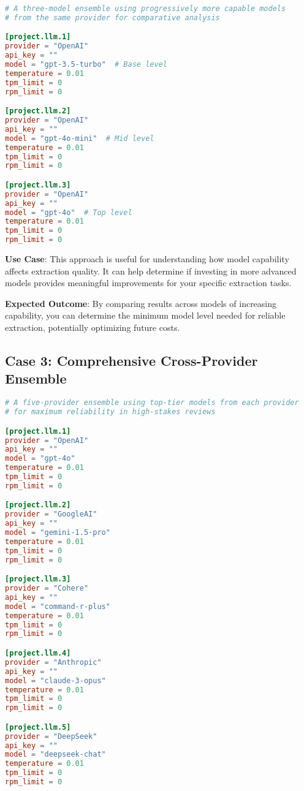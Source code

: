 \begin{configbox}
\begin{lstlisting}[language=TOML]
# A three-model ensemble using progressively more capable models
# from the same provider for comparative analysis

[project.llm.1]
provider = "OpenAI"
api_key = ""
model = "gpt-3.5-turbo"  # Base level
temperature = 0.01
tpm_limit = 0
rpm_limit = 0

[project.llm.2]
provider = "OpenAI"
api_key = ""
model = "gpt-4o-mini"  # Mid level
temperature = 0.01
tpm_limit = 0
rpm_limit = 0

[project.llm.3]
provider = "OpenAI"
api_key = ""
model = "gpt-4o"  # Top level
temperature = 0.01
tpm_limit = 0
rpm_limit = 0
\end{lstlisting}
\end{configbox}

\textbf{Use Case}: This approach is useful for understanding how model capability affects extraction quality. It can help determine if investing in more advanced models provides meaningful improvements for your specific extraction tasks.

\textbf{Expected Outcome}: By comparing results across models of increasing capability, you can determine the minimum model level needed for reliable extraction, potentially optimizing future costs.

\subsection{Case 3: Comprehensive Cross-Provider Ensemble}

\begin{configbox}
\begin{lstlisting}[language=TOML]
# A five-provider ensemble using top-tier models from each provider
# for maximum reliability in high-stakes reviews

[project.llm.1]
provider = "OpenAI"
api_key = ""
model = "gpt-4o"
temperature = 0.01
tpm_limit = 0
rpm_limit = 0

[project.llm.2]
provider = "GoogleAI"
api_key = ""
model = "gemini-1.5-pro"
temperature = 0.01
tpm_limit = 0
rpm_limit = 0

[project.llm.3]
provider = "Cohere"
api_key = ""
model = "command-r-plus"
temperature = 0.01
tpm_limit = 0
rpm_limit = 0

[project.llm.4]
provider = "Anthropic"
api_key = ""
model = "claude-3-opus"
temperature = 0.01
tpm_limit = 0
rpm_limit = 0

[project.llm.5]
provider = "DeepSeek"
api_key = ""
model = "deepseek-chat"
temperature = 0.01
tpm_limit = 0
rpm_limit = 0
\end{lstlisting}
\end{configbox}

